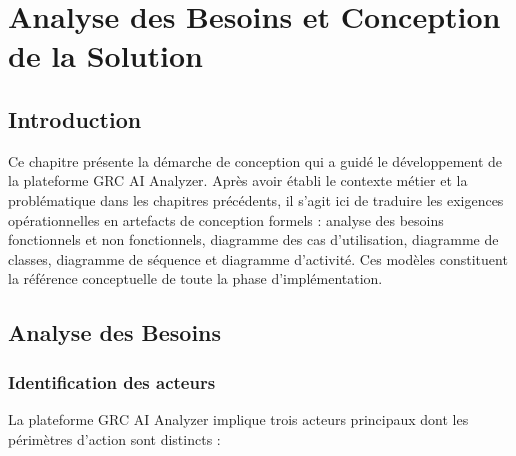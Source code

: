 \chapter{Analyse des Besoins et Conception de la Solution}

\section*{Introduction}

Ce chapitre présente la démarche de conception qui a guidé le développement
de la plateforme GRC AI Analyzer. Après avoir établi le contexte métier et
la problématique dans les chapitres précédents, il s'agit ici de traduire
les exigences opérationnelles en artefacts de conception formels : analyse
des besoins fonctionnels et non fonctionnels, diagramme des cas d'utilisation,
diagramme de classes, diagramme de séquence et diagramme d'activité.
Ces modèles constituent la référence conceptuelle de toute la phase
d'implémentation.

\section{Analyse des Besoins}

\subsection{Identification des acteurs}

La plateforme GRC AI Analyzer implique trois acteurs principaux dont les
périmètres d'action sont distincts :


